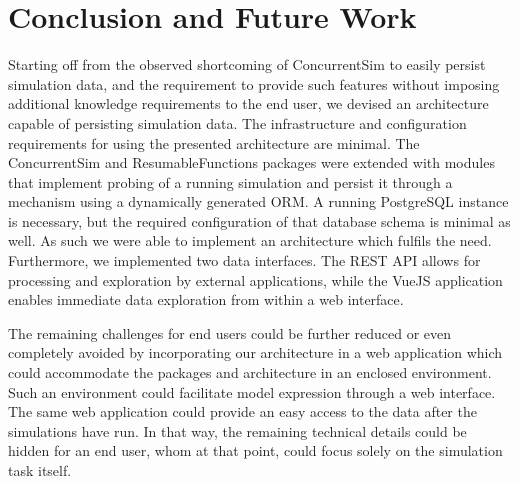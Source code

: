 \documentclass{juliacon}
\begin{document}
\section{Conclusion and Future Work}

Starting off from the observed shortcoming of ConcurrentSim to easily persist simulation data, and the requirement to provide such features without imposing additional knowledge requirements to the end user, we devised an architecture capable of persisting simulation data. The infrastructure and configuration requirements for using the presented architecture are minimal. The ConcurrentSim and ResumableFunctions packages were extended with modules that implement probing of a running simulation and persist it through a mechanism using a dynamically generated ORM. A running PostgreSQL instance is necessary, but the required configuration of that database schema is minimal as well. As such we were able to implement an architecture which fulfils the need. Furthermore, we implemented two data interfaces. The REST API allows for processing and exploration by external applications, while the VueJS application enables immediate data exploration from within a web interface. \vskip 6pt

The remaining challenges for end users could be further reduced or even completely avoided by incorporating our architecture in a web application which could accommodate the packages and architecture in an enclosed environment. Such an environment could facilitate model expression through a web interface. The same web application could provide an easy access to the data after the simulations have run. In that way, the remaining technical details could be hidden for an end user, whom at that point, could focus solely on the simulation task itself. \vskip 6pt




%
\end{document}
